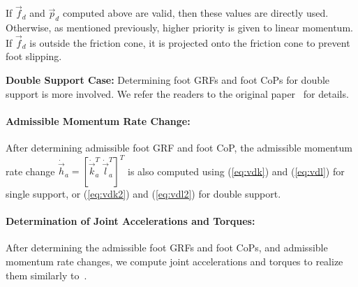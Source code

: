 \documentclass{llncs}
\newcommand{\mdA} 	{\boldsymbol{\dot{A}}}
\newcommand {\mat}[1] {{\bf #1}}
\newcommand{\mA} {\mat{A}}
\newcommand{\real} {\mathbb{R}}
\newcommand{\vp}{\vec{p}}
\newcommand{\vk}{\vec{k}}
\newcommand{\vf}{\vec{f}}
\newcommand{\vh}{\vec{h}}
\newcommand{\vdh} {\dot{\vec{h}}}
\newcommand{\vdk} {\dot{\vec{k}}}
\newcommand{\vl}{\vec{l}}
\newcommand{\vdl} {\dot{\vec{l}}}
\newcommand{\vdq} {\dot{\vec{q}}}
\newcommand{\vddq} {\ddot{\vec{q}}}
\begin{document}
If $\vf_d$ and $\vp_d$ computed above are valid, then these
values are directly used. Otherwise, as mentioned previously, higher priority is given to linear
momentum. If $\vf_d$ is outside the friction cone, it is projected
onto the friction cone to prevent foot slipping.

{\bf Double Support Case:}
Determining foot GRFs and foot CoPs for double support is more involved. We refer the readers to the original paper~\cite{LG12} for details.



\paragraph*{Admissible Momentum Rate Change:}
After determining admissible foot GRF and foot CoP, the admissible
momentum rate change $\vdh_a=[\vdk_a^T~\vdl_a^T]^T$ is also computed
using (\ref{eq:vdk}) and (\ref{eq:vdl}) for single support, or (\ref{eq:vdk2}) and (\ref{eq:vdl2})
for double support.

\paragraph{Determination of Joint Accelerations and Torques:}
\label{sec:joint_acc}

After determining the admissible foot GRFs and foot CoPs, and admissible momentum
rate changes, we compute joint accelerations and torques
to realize them similarly to~\cite{Macchietto09}.

\end{document}

